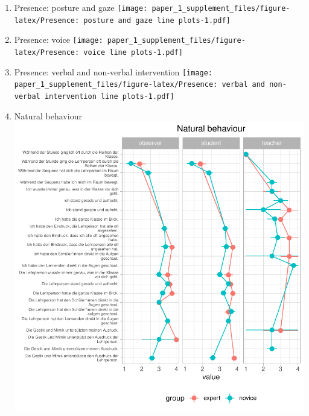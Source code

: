 \documentclass[
  english,
  man,floatsintext]{apa6}
\begin{document}
\begin{enumerate}
\item
  Presence: posture and gaze
  \texttt{[image: paper\_1\_supplement\_files/figure-latex/Presence: posture and gaze line plots-1.pdf]}
\item
  Presence: voice
  \texttt{[image: paper\_1\_supplement\_files/figure-latex/Presence: voice line plots-1.pdf]}
\item
  Presence: verbal and non-verbal intervention
  \texttt{[image: paper\_1\_supplement\_files/figure-latex/Presence: verbal and non-verbal intervention line plots-1.pdf]}
\item
  Natural behaviour
  \includegraphics{paper_1_supplement_files/figure-latex/Natural behaviour line plots-1.pdf}
\end{enumerate}
\end{document}
